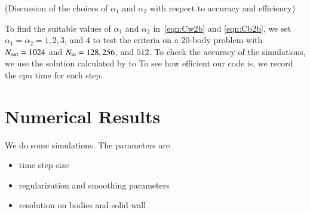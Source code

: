 \documentclass[preprint, 10pt]{elsarticle}
\begin{document}
{\color{red}  (Discussion of the choices of $\alpha_1$ and $\alpha_2$ with respect to accuracy and  efficiency)

To find the suitable values of $\alpha_1$ and $\alpha_2$ in~\eqref{eqn:Cw2b} and \eqref{eqn:Cb2b}, we set $\alpha_1=\alpha_2=1, 2, 3$, and $4$ to test the criteria on a 20-body problem with $N_{\mathrm{out}} = 1024$ and $N_{\mathrm{in}} = 128, 256$, and $512$. To check the accuracy of the simulations, we use the solution calculated by  to 
To see how efficient our code is, we record the cpu time for each step.

}

\section{Numerical Results}
\label{s:results}
We do some simulations.  The parameters are
\begin{itemize}
  \item time step size
  \item regularization and smoothing parameters
  \item resolution on bodies and solid wall
\end{itemize}

\end{document}
